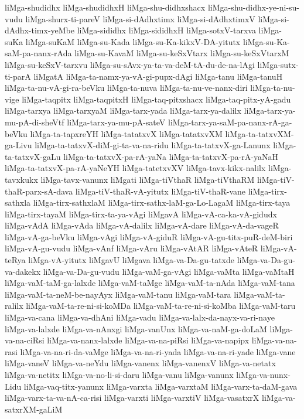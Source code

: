 {liMga-shudidhx
liMga-shudidhxH
liMga-shu-didhxshacx
liMga-shu-didhx-ye-ni-su-vudu
liMga-shurx-ti-pareV
liMga-si-dAdhxtimx
liMga-si-dAdhxtimxV
liMga-si-dAdhx-timx-yeMbe
liMga-sididhx
liMga-sididhxH
liMga-sotxV-tarxva
liMga-suKa
liMga-suKaM
liMga-su-Kada
liMga-su-Ka-kikxV-DA-yitutx
liMga-su-Ka-saM-pa-nanx-rAda
liMga-su-KavaM
liMga-su-keSxVtarx
liMga-su-keSxVtarxM
liMga-su-keSxV-tarxvu
liMga-su-sAvx-ya-ta-va-deM-tA-du-de-na-lAgi
liMga-sutx-ti-parA
liMgatA
liMga-ta-namx-ya-vA-gi-pupx-dAgi
liMga-tanu
liMga-tanuH
liMga-ta-nu-vA-gi-ra-beVku
liMga-ta-nuva
liMga-ta-nu-ve-nanx-diri
liMga-ta-nu-vige
liMga-taqpitx
liMga-taqpitxH
liMga-taq-pitxshacx
liMga-taq-pitx-yA-gadu
liMga-tarxya
liMga-tarxyaM
liMga-tarx-yada
liMga-tarx-ya-dalilx
liMga-tarx-ya-mu-pA-di-sheVtf
liMga-tarx-ya-mu-pA-sateV
liMga-tarx-ya-saM-pa-nanx-rA-ga-beVku
liMga-ta-tapxreYH
liMga-tatatxvX
liMga-tatatxvXM
liMga-ta-tatxvXM-ga-Livu
liMga-ta-tatxvX-diM-gi-ta-va-na-ridu
liMga-ta-tatxvX-ga-Lanunx
liMga-ta-tatxvX-gaLu
liMga-ta-tatxvX-pa-rA-yaNa
liMga-ta-tatxvX-pa-rA-yaNaH
liMga-ta-tatxvX-pa-rA-yaNeYH
liMga-tatetxvXV
liMga-tavx-kikx-nalilx
liMga-tavxkukx
liMga-tavx-vanunx
liMgati
liMga-tiVthaR
liMga-tiVthaRM
liMga-tiV-thaR-parx-sA-dava
liMga-tiV-thaR-vA-yitutx
liMga-tiV-thaR-vane
liMga-tirx-sathxla
liMga-tirx-sathxlaM
liMga-tirx-sathx-laM-ga-Lo-LagaM
liMga-tirx-taya
liMga-tirx-tayaM
liMga-tirx-ta-ya-vAgi
liMgavA
liMga-vA-ca-ka-vA-gidudx
liMga-vAdA
liMga-vAda
liMga-vA-dalilx
liMga-vA-dare
liMga-vA-da-vageR
liMga-vA-ga-beVku
liMga-vAgi
liMga-vA-giduR
liMga-vA-gu-titx-puR-deM-biri
liMga-vA-gu-vudu
liMga-vAnf
liMga-vAru
liMga-vAtAR
liMga-vAteR
liMga-vA-teRya
liMga-vA-yitutx
liMgavU
liMgava
liMga-va-Da-gu-tatxde
liMga-va-Da-gu-va-dakekx
liMga-va-Da-gu-vudu
liMga-vaM-ga-vAgi
liMga-vaMta
liMga-vaMtaH
liMga-vaM-taM-ga-lalxde
liMga-vaM-taMge
liMga-vaM-ta-nAda
liMga-vaM-tana
liMga-vaM-ta-neM-be-nayAyx
liMga-vaM-tanu
liMga-vaM-tara
liMga-vaM-ta-ralilx
liMga-vaM-ta-re-ni-si-koMDa
liMga-vaM-ta-re-ni-si-koMba
liMga-vaM-taru
liMga-va-cana
liMga-va-dhAni
liMga-vadu
liMga-va-lalx-da-nayx-va-ri-naye
liMga-va-lalxde
liMga-va-nAnxgi
liMga-vanUnx
liMga-va-naM-ga-doLaM
liMga-va-na-ciRsi
liMga-va-nanx-lalxde
liMga-va-na-piRsi
liMga-va-napipx
liMga-va-na-rasi
liMga-va-na-ri-da-vaMge
liMga-va-na-ri-yada
liMga-va-na-ri-yade
liMga-vane
liMga-vaneV
liMga-va-neYdu
liMga-vanenx
liMga-vanenxV
liMga-va-netatx
liMga-va-netitx
liMga-va-no-li-si-daru
liMga-vanu
liMga-vanunx
liMga-va-nunx-Lidu
liMga-vaq-titx-yanunx
liMga-varxta
liMga-varxtaM
liMga-varx-ta-daM-gava
liMga-varx-ta-va-nA-ca-risi
liMga-varxti
liMga-varxtiV
liMga-vasatxrX
liMga-va-satxrXM-gaLiM
}

